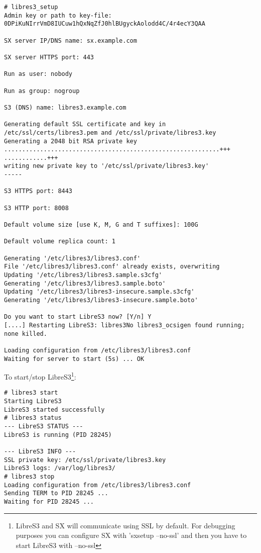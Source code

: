 \begin{lstlisting}
# libres3_setup
Admin key or path to key-file: 0DPiKuNIrrVmD8IUCuw1hQxNqZfJ0hlBUgyckAolodd4C/4r4ecY3QAA

SX server IP/DNS name: sx.example.com

SX server HTTPS port: 443

Run as user: nobody

Run as group: nogroup

S3 (DNS) name: libres3.example.com

Generating default SSL certificate and key in /etc/ssl/certs/libres3.pem and /etc/ssl/private/libres3.key
Generating a 2048 bit RSA private key
............................................................+++
............+++
writing new private key to '/etc/ssl/private/libres3.key'
-----

S3 HTTPS port: 8443

S3 HTTP port: 8008

Default volume size [use K, M, G and T suffixes]: 100G

Default volume replica count: 1

Generating '/etc/libres3/libres3.conf'
File '/etc/libres3/libres3.conf' already exists, overwriting
Updating '/etc/libres3/libres3.sample.s3cfg'
Generating '/etc/libres3/libres3.sample.boto'
Updating '/etc/libres3/libres3-insecure.sample.s3cfg'
Generating '/etc/libres3/libres3-insecure.sample.boto'

Do you want to start LibreS3 now? [Y/n] Y
[....] Restarting LibreS3: libres3No libres3_ocsigen found running; none killed.

Loading configuration from /etc/libres3/libres3.conf
Waiting for server to start (5s) ... OK
\end{lstlisting}


To start/stop LibreS3\footnote{LibreS3 and SX will communicate using SSL by
default. For debugging purposes you can configure SX with 'sxsetup --no-ssl' and then you have to start LibreS3 with --no-ssl}:


\begin{lstlisting}
# libres3 start
Starting LibreS3
LibreS3 started successfully
# libres3 status
--- LibreS3 STATUS ---
LibreS3 is running (PID 28245)

--- LibreS3 INFO ---
SSL private key: /etc/ssl/private/libres3.key
LibreS3 logs: /var/log/libres3/
# libres3 stop
Loading configuration from /etc/libres3/libres3.conf
Sending TERM to PID 28245 ... 
Waiting for PID 28245 ...
\end{lstlisting}


